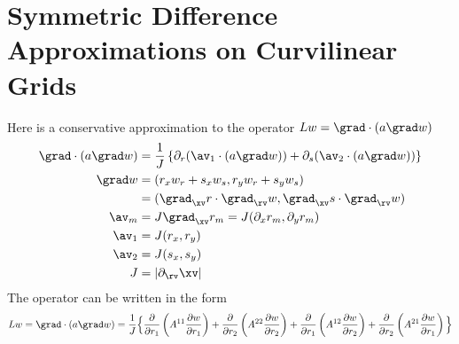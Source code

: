 \documentclass[10pt]{article}
\begin{document}
\section{Symmetric Difference Approximations on Curvilinear Grids}
Here is a conservative approximation to the operator $L w = \grad\cdot( a  \grad w)$
\begin{align*}
   \grad\cdot( a  \grad w) & =
        {1\over J}\left\{ \partial_r( \av_1\cdot(a\grad w)) + \partial_s( \av_2\cdot(a\grad w)) \right\} \\
   \grad w &= ( r_x w_r + s_x w_s, r_y w_r + s_y w_s )\\
           &= (\grad_\xv r \cdot \grad_\rv w, \grad_\xv s \cdot \grad_\rv w) \\
   \av_m  & = J \grad_\xv r_m  = J( \partial_x r_m ,\partial_y r_m )  \\
   \av_1  & = J( r_x,r_y)  \\
   \av_2  & = J( s_x,s_y)  \\
    J &= | \partial_\rv \xv |
\end{align*}
The operator can be written in the form
\[
 Lw = 
\grad\cdot( a \grad w) = {1\over J} \Big\lbrace  
        {\partial\over\partial r_1}\left( A^{11} {\partial w \over\partial r_1} \right) +
        {\partial\over\partial r_2}\left( A^{22} {\partial w \over\partial r_2} \right) + 
        {\partial\over\partial r_1}\left( A^{12} {\partial w \over\partial r_2} \right) + 
        {\partial\over\partial r_2}\left( A^{21} {\partial w \over\partial r_1} \right) \Big\rbrace 
\]
\end{document}
